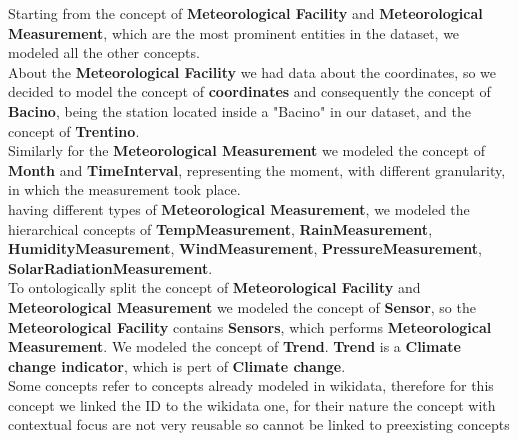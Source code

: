 Starting from the concept of \textbf{Meteorological Facility} and \textbf{Meteorological Measurement}, which are the most
prominent entities in the dataset, we modeled all the other concepts.\\

About the \textbf{Meteorological Facility} we had data about the coordinates, so we decided to model the concept of
\textbf{coordinates} and consequently the concept of \textbf{Bacino}, being the station located inside a "Bacino" in our dataset,
and the concept of \textbf{Trentino}.\\

Similarly for the \textbf{Meteorological Measurement} we modeled the concept of \textbf{Month} and \textbf{TimeInterval}, representing
the moment, with different granularity, in which the measurement took place.\\

having different types of \textbf{Meteorological Measurement}, we modeled the hierarchical concepts of \textbf{TempMeasurement},
\textbf{RainMeasurement}, \textbf{HumidityMeasurement}, \textbf{WindMeasurement}, \textbf{PressureMeasurement},
\textbf{SolarRadiationMeasurement}.\\

To ontologically split the concept of \textbf{Meteorological Facility} and \textbf{Meteorological Measurement} we modeled
the concept of \textbf{Sensor}, so the \textbf{Meteorological Facility} contains \textbf{Sensors}, which performs \textbf{Meteorological Measurement}.
We modeled the concept of \textbf{Trend}.
\textbf{Trend} is a \textbf{Climate change indicator}, which is pert of \textbf{Climate change}.\\

Some concepts refer to concepts already modeled in wikidata, therefore for this concept we linked the ID to the wikidata one,
for their nature the concept with contextual focus are not very reusable so cannot be linked to preexisting concepts

